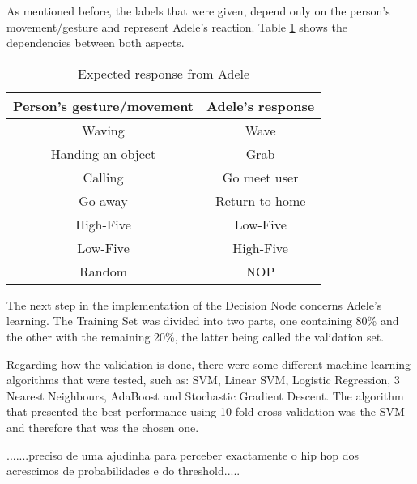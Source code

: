 As mentioned before, the labels that were given, depend only on the person's movement/gesture and represent Adele's reaction. Table \color{red}\ref{tab:expected_response} \color{black} shows the dependencies between both aspects.
\begin{table}[!h]
\centering
\label{tab:expected_response}
\begin{tabular}{|c|c|}
\hline
\textbf{Person's gesture/movement} & \textbf{Adele's response} \\ \hline
Waving                           & Wave                                 \\
Handing an object                & Grab                            		\\
Calling                          & Go meet user                         \\
Go away                          & Return to home                       \\
High-Five                        & Low-Five                             \\
Low-Five                         & High-Five                            \\
Random                           & NOP                                  \\ \hline
\end{tabular}
\caption{Expected response from Adele}
\end{table}

The next step in the implementation of the Decision Node concerns Adele's learning. The Training Set was divided into two parts, one containing 80\% and the other with the remaining 20\%, the latter being called the validation set.

Regarding how the validation is done, there were some different machine learning algorithms that were tested, such as: SVM, Linear SVM, Logistic Regression, 3 Nearest Neighbours, AdaBoost and Stochastic Gradient Descent. The algorithm that presented the best performance using 10-fold cross-validation was the SVM and therefore that was the chosen one.

\color{red}
.......preciso de uma ajudinha para perceber exactamente o hip hop dos acrescimos de probabilidades e do threshold.....
\color{black}

